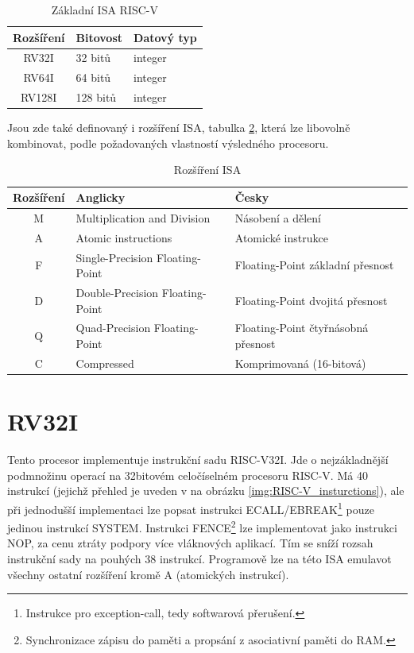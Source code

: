 \documentclass[FM,BP]{tulthesis}
\begin{document}
\begin{table}[h]
    \caption{Základní ISA RISC-V}
    \label{table:ISA_bitovost}
    \begin{center}
    \begin{tabular}{|c|l|l|}
    \hline
    \textbf{Rozšíření} & \textbf{Bitovost} & \textbf{Datový typ} \\
    \hline
    RV32I & 32 bitů & integer\\
    RV64I & 64 bitů & integer \\
    RV128I & 128 bitů & integer\\
    \hline
    \end{tabular}
    \end{center}
\end{table}

Jsou zde také definovaný i rozšíření ISA, tabulka \ref{table:ISA_extension}, která lze libovolně kombinovat, podle požadovaných vlastností výsledného procesoru.

\begin{table}[h]
    \begin{center}
    \caption{Rozšíření ISA}
    \label{table:ISA_extension}
    \begin{tabular}{|c|l|l|}
    \hline
    \textbf{Rozšíření} & \textbf{Anglicky} & \textbf{Česky} \\
    \hline
    M & Multiplication and Division & Násobení a dělení \\
    A & Atomic instructions & Atomické instrukce \\
    F & Single-Precision Floating-Point & Floating-Point základní přesnost\\
    D & Double-Precision Floating-Point & Floating-Point dvojitá přesnost\\
    Q & Quad-Precision Floating-Point & Floating-Point čtyřnásobná přesnost\\
    C & Compressed & Komprimovaná (16-bitová) \\
    \hline
    \end{tabular}
    \end{center}
\end{table}

\section{RV32I} \label{kap:RV32I}
Tento procesor implementuje instrukční sadu RISC-V32I. Jde o nejzákladnější podmnožinu operací na 32bitovém celočíselném procesoru RISC-V. Má 40 instrukcí (jejichž přehled je uveden v na obrázku \ref{img:RISC-V_insturctions}), ale při jednodušší implementaci lze popsat instrukci ECALL/EBREAK\footnote{Instrukce pro exception-call, tedy softwarová přerušení.} pouze jedinou instrukcí SYSTEM. Instrukci FENCE\footnote{Synchronizace zápisu do paměti a propsání z asociativní paměti do RAM.} lze implementovat jako instrukci NOP, za cenu ztráty podpory více vláknových aplikací. Tím se sníží rozsah instrukční sady na pouhých 38 instrukcí. 
Programově lze na této ISA emulavot všechny ostatní rozšíření kromě A (atomických instrukcí). 
\end{document}
